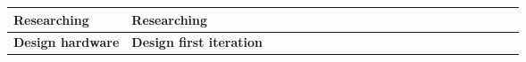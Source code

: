 \begin{table}[ht!]
\begin{tabular}{lp{2.5in}|llllllllllllllllllll|}
    \multicolumn{1}{|l|}{\cellcolor[HTML]{00E2FF}\textbf{Researching}}     & \cellcolor[HTML]{00E2FF}\textbf{Researching}                               & \multicolumn{1}{l|}{}                                   & \multicolumn{1}{l|}{}                                   & \multicolumn{1}{l|}{\cellcolor[HTML]{F8A102}}           & \multicolumn{1}{l|}{\cellcolor[HTML]{F8A102}}           & \multicolumn{1}{l|}{}                                   & \multicolumn{1}{l|}{}                                   & \multicolumn{1}{l|}{}                                   & \multicolumn{1}{l|}{}                                   & \multicolumn{1}{l|}{}                                   & \multicolumn{1}{l|}{}                                    & \multicolumn{1}{l|}{}                                    & \multicolumn{1}{l|}{}                                    & \multicolumn{1}{l|}{}                                    & \multicolumn{1}{l|}{}                                    & \multicolumn{1}{l|}{}                                    & \multicolumn{1}{l|}{}                                    & \multicolumn{1}{l|}{}                                    & \multicolumn{1}{l|}{}                                    & \multicolumn{1}{l|}{}                                    &             \\ \hline
    \multicolumn{1}{|l|}{\cellcolor[HTML]{00E2FF}\textbf{Design hardware}} & \cellcolor[HTML]{00E2FF}\textbf{Design first iteration}                    & \multicolumn{1}{l|}{}                                   & \multicolumn{1}{l|}{}                                   & \multicolumn{1}{l|}{}                                   & \multicolumn{1}{l|}{}                                   & \multicolumn{1}{l|}{\cellcolor[HTML]{F8A102}}           & \multicolumn{1}{l|}{\cellcolor[HTML]{F8A102}}           & \multicolumn{1}{l|}{\cellcolor[HTML]{F8A102}}           & \multicolumn{1}{l|}{\cellcolor[HTML]{F8A102}}           & \multicolumn{1}{l|}{\cellcolor[HTML]{F8A102}}           & \multicolumn{1}{l|}{}                                    & \multicolumn{1}{l|}{}                                    & \multicolumn{1}{l|}{}                                    & \multicolumn{1}{l|}{}                                    & \multicolumn{1}{l|}{}                                    & \multicolumn{1}{l|}{}                                    & \multicolumn{1}{l|}{}                                    & \multicolumn{1}{l|}{}                                    & \multicolumn{1}{l|}{}                                    & \multicolumn{1}{l|}{}                                    &             \\ \hline

\end{tabular}
\end{table}
